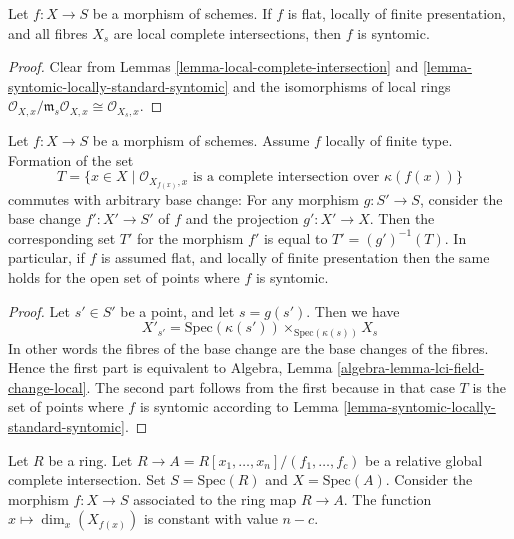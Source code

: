 \begin{lemma}
\label{lemma-syntomic-flat-fibres}
Let $f : X \to S$ be a morphism of schemes.
If $f$ is flat, locally of finite presentation, and all
fibres $X_s$ are local complete intersections, then $f$
is syntomic.
\end{lemma}

\begin{proof}
Clear from Lemmas
\ref{lemma-local-complete-intersection} and
\ref{lemma-syntomic-locally-standard-syntomic}
and the isomorphisms of local rings
$
\mathcal{O}_{X, x}/\mathfrak m_s \mathcal{O}_{X, x}
\cong
\mathcal{O}_{X_s, x}
$.
\end{proof}

\begin{lemma}
\label{lemma-set-points-where-fibres-lci}
Let $f : X \to S$ be a morphism of schemes.
Assume $f$ locally of finite type. Formation of the set
$$
T = \{x \in X \mid \mathcal{O}_{X_{f(x)}, x}
\text{ is a complete intersection over }\kappa(f(x))\}
$$
commutes with arbitrary base change:
For any morphism $g : S' \to S$, consider
the base change $f' : X' \to S'$ of $f$ and the
projection $g' : X' \to X$. Then the corresponding
set $T'$ for the morphism $f'$ is equal to $T' = (g')^{-1}(T)$.
In particular, if $f$ is assumed flat, and locally of finite
presentation then the same holds for the open set of points
where $f$ is syntomic.
\end{lemma}

\begin{proof}
Let $s' \in S'$ be a point, and let $s = g(s')$. Then we have
$$
X'_{s'} =
\text{Spec}(\kappa(s')) \times_{\text{Spec}(\kappa(s))} X_s
$$
In other words the fibres of the base change are the base changes
of the fibres. Hence the first part is equivalent to
Algebra, Lemma \ref{algebra-lemma-lci-field-change-local}.
The second part follows from the first because in that case
$T$ is the set of points where $f$ is syntomic according to
Lemma \ref{lemma-syntomic-locally-standard-syntomic}.
\end{proof}

\begin{lemma}
\label{lemma-standard-syntomic-relative-dimension}
Let $R$ be a ring.
Let $R \to A = R[x_1, \ldots, x_n]/(f_1, \ldots, f_c)$ be a relative
global complete intersection. Set $S = \text{Spec}(R)$ and
$X = \text{Spec}(A)$. Consider the morphism
$f : X \to S$ associated to the ring map $R \to A$.
The function $x \mapsto \dim_x(X_{f(x)})$ is constant with value $n - c$.
\end{lemma}

